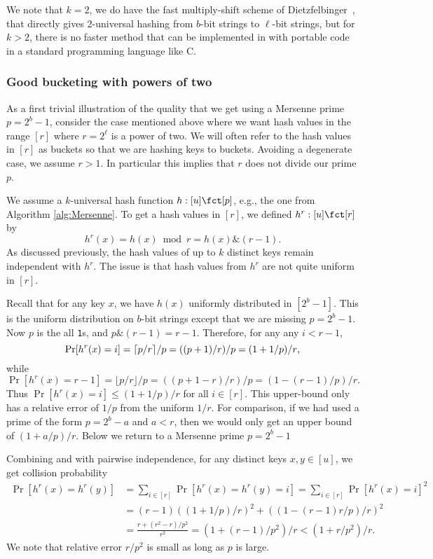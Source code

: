 We note that $k=2$, we do have the fast multiply-shift scheme of Dietzfelbinger~\cite{dietzfel96universal}, that directly gives 2-universal
hashing from $b$-bit strings to $\ell$-bit strings, but for $k>2$,
there is no faster method that can be implemented in with portable code
in a standard programming language like C.




\subsubsection{Good bucketing with powers of two}\label{sec:power-of-two}
As a first trivial illustration of the quality that we get using a
Mersenne prime $p=2^b-1$, consider the case mentioned above where we
want hash values in the range $[r]$ where $r=2^\ell$ is a power of
two. We will often refer to the hash values in $[r]$ as buckets so
that we are hashing keys to buckets. Avoiding a degenerate case, we
assume $r>1$. In particular this implies that $r$ does not divide our
prime $p$.

We assume a $k$-universal hash function $h:[u]\fct[p]$, e.g.,
the one from Algorithm \ref{alg:Mersenne}. To get a hash values in $[r]$,
we defined $h^r:[u]\fct[r]$ by
\[h^r(x)=h(x)\bmod r=h(x)\texttt \& (r-1).\]
As discussed previously, the hash values of up to $k$ distinct keys remain
independent with $h^r$. The issue is that hash values from 
$h^r$ are not quite uniform in $[r]$.

Recall that for any key $x$, we have $h(x)$ uniformly distributed in $[2^b-1]$.
This is the uniform distribution on $b$-bit strings except that we are
missing $p=2^b-1$. Now $p$ is the all \texttt{1}s, and 
$p\texttt \& (r-1)=r-1$. Therefore, for any 
any $i<r-1$,
\begin{equation}\label{eq:coll-ell<r-1}
\Pr[h^r(x)=i]=\lceil p/r\rceil/p=((p+1)/r)/p
=(1+1/p)/r\textnormal,
\end{equation}
while 
\begin{equation}\label{eq:coll-ell=r-1}
 \Pr[h^r(x)=r-1]=\lfloor p/r\rfloor/p=((p+1-r)/r)/p
=(1-(r-1)/p)/r.
\end{equation}
Thus $\Pr[h^r(x)=i]\leq (1+1/p)/r$ for all $i\in[r]$. This upper-bound
only has a relative error of $1/p$ from the uniform $1/r$. For
comparison, if we had used a prime of the form $p=2^b-a$ and $a<r$, then
we would only get an upper bound of $(1+a/p)/r$. Below we return
to a Mersenne prime $p=2^b-1$

Combining  and  with
pairwise independence, for any distinct keys $x,y\in [u]$, we get
collision probability
\begin{align}
  \Pr[h^r(x)=h^r(y)]&=\sum_{i\in[r]}\Pr[h^r(x)=h^r(y)=i]=\sum_{i\in[r]}\Pr[h^r(x)=i]^2\nonumber\\
                   &=(r-1)((1+1/p)/r)^2+((1-(r-1)r/p)/r)^2\nonumber\\[.5ex]
  &=\frac{r +(r^2-r)/p^2}{r^2}=(1+(r-1)/p^2)/r<(1+r/p^2)/r.\label{eq:coll}
  \end{align}
We note that relative error $r/p^2$ is small as long as $p$ is
large.

